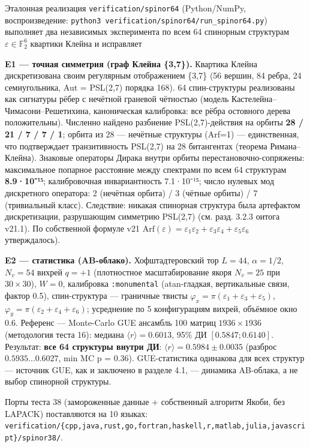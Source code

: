 \documentclass[
]{article}
\begin{document}
Эталонная реализация \texttt{verification/spinor64} (Python/NumPy,
воспроизведение:
\texttt{python3\ verification/spinor64/run\_spinor64.py}) выполняет два
независимых эксперимента по всем 64 спинорным структурам
\(\varepsilon\in\mathbb{F}_2^6\) квартики Клейна и исправляет

\textbf{E1 --- точная симметрия (граф Клейна \{3,7\}).} Квартика Клейна
дискретизована своим регулярным отображением \{3,7\} (56 вершин, 84
ребра, 24 семиугольника, Aut = PSL(2,7) порядка 168). 64 спин-структуры
реализованы как сигнатуры рёбер с нечётной граневой чётностью (модель
Кастелейна--Чимасони--Решетихина, каноническая калибровка: все рёбра
остовного дерева положительны). Численно найдено разбиение
PSL(2,7)-действия на орбиты \textbf{28 / 21 / 7 / 7 / 1}; орбита из 28
--- нечётные структуры (Arf=1) --- единственная, что подтверждает
транзитивность PSL(2,7) на 28 битангентах (теорема Римана--Клейна).
Знаковые операторы Дирака внутри орбиты перестановочно-сопряжены:
максимальное попарное расстояние между спектрами по всем 64 структурам
\textbf{8.9·10⁻¹⁵}; калибровочная инвариантность 7.1·10⁻¹⁵; число
нулевых мод дискретного оператора: 2 (нечётная орбита) / 3 (чётные
орбиты) / 7 (тривиальный класс). Следствие: никакая спинорная структура
была артефактом дискретизации, разрушающим симметрию PSL(2,7) (см. разд.
3.2.3 оитога v21.1). По собственной формуле v21
\(\mathrm{Arf}(\varepsilon)=
\varepsilon_1\varepsilon_2+\varepsilon_3\varepsilon_4+\varepsilon_5\varepsilon_6\)
утверждалось).

\textbf{E2 --- статистика (AB-облако).} Хофштадтеровский тор \(L=44\),
\(\alpha=1/2\), \(N_v=54\) вихрей \(q=+1\) (плотностное масштабирование
якоря \(N_v=25\) при \(30\times30\)), \(W=0\), калибровка
\texttt{:monumental} (atan-гладкая, вертикальные связи, фактор 0.5),
спин-структура --- граничные твисты
\(\varphi_x=\pi(\varepsilon_1+\varepsilon_3+\varepsilon_5)\),
\(\varphi_y=\pi(\varepsilon_2+\varepsilon_4+\varepsilon_6)\); усреднение
по 5 конфигурациям вихрей, объёмное окно 0.6. Референс --- Monte-Carlo
GUE ансамбль 100 матриц \(1936\times1936\) (методология теста 16):
медиана \(\langle r\rangle = 0.6013\), 95\% ДИ \([0.5847; 0.6140]\).
Результат: \textbf{все 64 структуры внутри ДИ}:
\(\langle r\rangle = 0.5984\pm0.0035\) (разброс \(0.5935\dots0.6027\),
min MC p = 0.36). GUE-статистика одинакова для всех структур ---
источник GUE, как и заключено в разделе 4.1, --- динамика AB-облака, а
не выбор спинорной структуры.

Порты теста 38 (замороженные данные + собственный алгоритм Якоби, без
LAPACK) поставляются на 10 языках:
\texttt{verification/\{cpp,java,rust,go,fortran,haskell,r,matlab,julia,javascript\}/spinor38/}.
\end{document}
